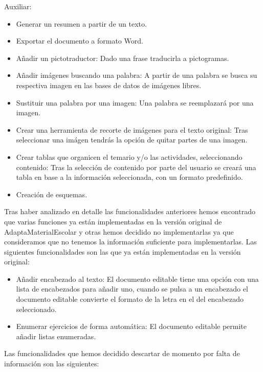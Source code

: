 Auxiliar:
\begin{itemize}
  \item Generar un resumen a partir de un texto.
  \item Exportar el documento a formato Word.
  \item Añadir un pictotraductor: Dado una frase traducirla a pictogramas.
  \item Añadir imágenes buscando una palabra: A partir de una palabra se busca su respectiva imagen en las bases de datos de imágenes libres.
  \item Sustituir una palabra por una imagen: Una palabra se reemplazará por una imagen.
  \item Crear una herramienta de recorte de imágenes para el texto original: Tras seleccionar una imágen tendrás la opción de quitar partes de una imagen. 
  \item Crear tablas que organicen el temario y/o las actividades, seleccionando contenido: Tras la selección de contenido por parte del usuario se creará una tabla en base a la información seleccionada, con un formato predefinido.
  \item Creación de esquemas.
\end{itemize}
Tras haber analizado en detalle las funcionalidades anteriores hemos encontrado que varias funciones ya están implementadas en la versión original de AdaptaMaterialEscolar y otras hemos decidido no implementarlas ya que consideramos que no tenemos la información suficiente para implementarlas. Las siguientes funcionalidades son las que ya están implementadas en la versión original:
  \begin{itemize}
    \item Añadir encabezado al texto: El documento editable tiene una opción con una lista de encabezados para añadir uno, cuando se pulsa a un encabezado el documento editable convierte el formato de la letra en el del encabezado seleccionado. 
    \item Enumerar ejercicios de forma automática: El documento editable permite añadir listas enumeradas.
  \end{itemize}
Las funcionalidades que hemos decidido descartar de momento por falta de información son las siguientes:
